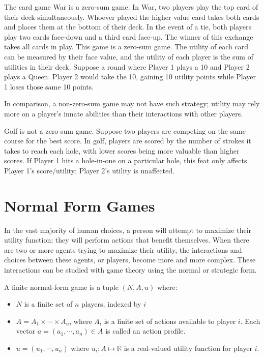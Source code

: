 \begin{exmp}
  The card game War is a zero-sum game. In War, two players play the top card of their deck simultaneously. Whoever played the higher value card takes both cards and places them at the bottom of their deck. In the event of a tie, both players play two cards face-down and a third card face-up. The winner of this exchange takes all cards in play. This game is a zero-sum game. The utility of each card can be measured by their face value, and the utility of each player is the sum of utilities in their deck. Suppose a round where Player 1 plays a 10 and Player 2 plays a Queen. Player 2 would take the 10, gaining 10 utility points while Player 1 loses those same 10 points.
\end{exmp}

In comparison, a non-zero-sum game may not have such strategy; utility may rely more on a player's innate abilities than their interactions with other players.

\begin{exmp}
  Golf is not a zero-sum game. Suppose two players are competing on the same course for the best score. In golf, players are scored by the number of strokes it takes to reach each hole, with lower scores being more valuable than higher scores. If Player 1 hits a hole-in-one on a particular hole, this feat only affects Player 1's score/utility; Player 2's utility is unaffected.
\end{exmp}

\section{Normal Form Games}
In the vast majority of human choices, a person will attempt to maximize their utility function; they will perform actions that benefit themselves. When there are two or more agents trying to maximize their utility, the interactions and choices between these agents, or players, become more and more complex. These interactions can be studied with game theory using the normal or strategic form.
\begin{define}
  A finite normal-form game is a tuple $(N, A, u)$ where:
  \begin{itemize}
  \item $N$ is a finite set of $n$ players, indexed by $i$
  \item $A=A_1\times\cdots\times A_n$, where $A_i$ is a finite set of actions available to player $i$. Each vector $a=(a_1,\cdots ,a_n)\in A$ is called an action profile.
    \item $u=(u_1,\cdots ,u_n)$ where $u_i : A \mapsto\mathbb{R}$ is a real-valued utility function for player $i$. \cite{shoh09}
\end{itemize}
\end{define}

